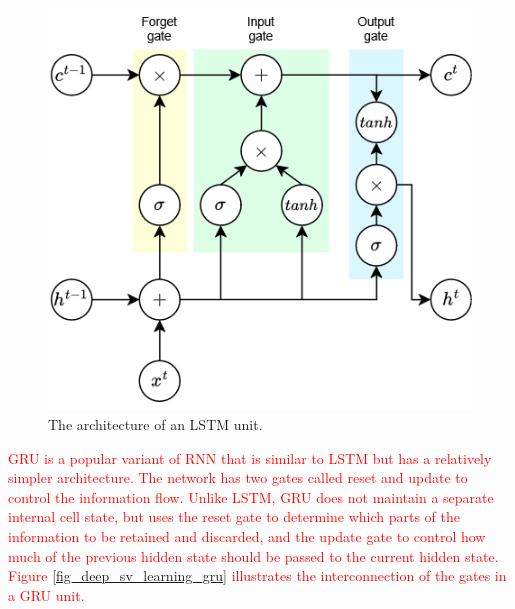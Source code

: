 \documentclass[preprint,12pt]{elsarticle}
\begin{document}
\begin{figure}[h!]
    \centering
    \includegraphics[scale=0.5]{fig_deep_sv_learning_lstm.png}
    \caption{The architecture of an LSTM unit.}
    \label{fig_deep_sv_learning_lstm}
\end{figure}

\textcolor{red}{GRU is a popular variant of RNN that is similar to LSTM but has a relatively simpler architecture. The network has two gates called reset and update to control the information flow. Unlike LSTM, GRU does not maintain a separate internal cell state, but uses the reset gate to determine which parts of the information to be retained and discarded, and the update gate to control how much of the previous hidden state should be passed to the current hidden state. Figure \ref{fig_deep_sv_learning_gru} illustrates the interconnection of the gates in a GRU unit.}
\end{document}

